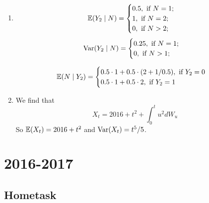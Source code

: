 \documentclass[12pt, a4paper]{article}
\begin{document}
\begin{enumerate}
\item
\[
\operatorname{\mathbb{E}}(Y_2 \mid N) =\begin{cases}
0.5, \text{ if } N=1; \\
1, \text{ if } N=2; \\
0, \text{ if } N>2; \\
\end{cases}
\]
\[
\operatorname{Var}(Y_2 \mid N) =\begin{cases}
0.25, \text{ if } N=1; \\
0, \text{ if } N>1; \\
\end{cases}
\]

\[
\operatorname{\mathbb{E}}(N \mid Y_2) = \begin{cases}
0.5 \cdot 1 + 0.5\cdot (2 + 1/0.5), \text{ if } Y_2 = 0 \\
0.5 \cdot 1 + 0.5\cdot 2, \text{ if } Y_2 = 1 \\
\end{cases}
\]

\item We find that
\[
X_t = 2016 + t^2 + \int_0^t u^2 dW_u
\]
So $\operatorname{\mathbb{E}}(X_t) = 2016 + t^2$ and $\operatorname{Var}(X_t) = t^5/5$.
\end{enumerate}


\section{2016-2017}

\subsection{Hometask}
\end{document}
